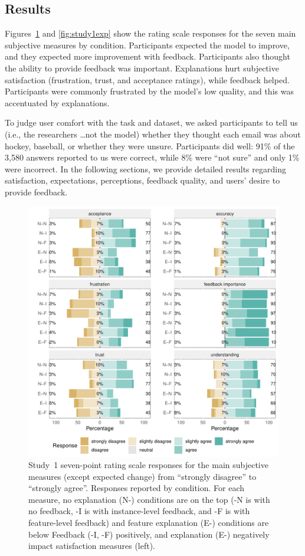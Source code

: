 


\subsection{Results}
Figures~\ref{fig:study1measures} and \ref{fig:study1exp} show the rating scale responses for the seven main subjective measures by condition. 
%
Participants expected the model to improve, and they expected more improvement with feedback. Participants also thought the ability to provide feedback was important. 
%
Explanations hurt subjective satisfaction (frustration, trust, and acceptance ratings), while feedback helped.
%
Participants were commonly frustrated by the model's low quality, and this was accentuated by explanations. 

To judge user comfort with the task and dataset, we asked participants to tell us (i.e., the researchers \dots not the model) whether they thought each email was about hockey, baseball, or whether they were unsure.
%
Participants did well: 91\% of the 3,580 answers reported to us were correct, while 8\% were ``not sure'' and only 1\% were incorrect. In the following sections, we provide detailed results regarding satisfaction, expectations, perceptions, feedback quality, and users' desire to provide feedback.

\begin{figure}[t]
    \includegraphics[width=\linewidth]{figures/study1-measures}
    \caption{Study~1 seven-point rating scale responses for the main subjective measures (except expected change) from ``strongly disagree'' to
``strongly agree''. Responses reported by condition. For each measure,
no explanation (N-) conditions are on the top (-N is with no feedback, -I
is with instance-level feedback, and -F is with feature-level feedback) and
feature explanation (E-) conditions are below Feedback (-I, -F) positively,
and explanation (E-) negatively impact satisfaction measures (left).}
\label{fig:study1measures}
\end{figure}

